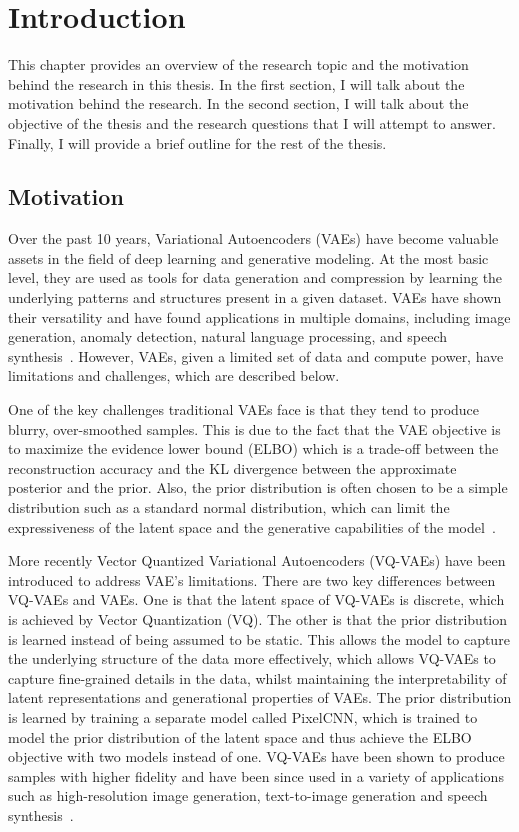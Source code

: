 \chapter{Introduction}

This chapter provides an overview of the research topic and the motivation behind the research in this thesis. In the first section, I will talk about the motivation behind the research. In the second section, I will talk about the objective of the thesis and the research questions that I will attempt to answer. Finally, I will provide a brief outline for the rest of the thesis.

\section{Motivation}

Over the past 10 years, Variational Autoencoders (VAEs) have become valuable assets in the field of deep learning and generative modeling. At the most basic level, they are used as tools for data generation and compression by learning the underlying patterns and structures present in a given dataset. VAEs have shown their versatility and have found applications in multiple domains, including image generation, anomaly detection, natural language processing, and speech synthesis~\cite{kingma2013autoencoding, Kingma_2019, vqvae, dalle}. However, VAEs, given a limited set of data and compute power, have limitations and challenges, which are described below.

One of the key challenges traditional VAEs face is that they tend to produce blurry, over-smoothed samples. This is due to the fact that the VAE objective is to maximize the evidence lower bound (ELBO) which is a trade-off between the reconstruction accuracy and the KL divergence between the approximate posterior and the prior. Also, the prior distribution is often chosen to be a simple distribution such as a standard normal distribution, which can limit the expressiveness of the latent space and the generative capabilities of the model~\cite{Kingma_2019}.

More recently Vector Quantized Variational Autoencoders (VQ-VAEs) have been introduced to address VAE's limitations. There are two key differences between VQ-VAEs and VAEs. One is that the latent space of VQ-VAEs is discrete, which is achieved by Vector Quantization (VQ). The other is that the prior distribution is learned instead of being assumed to be static. This allows the model to capture the underlying structure of the data more effectively, which allows VQ-VAEs to capture fine-grained details in the data, whilst maintaining the interpretability of latent representations and generational properties of VAEs. The prior distribution is learned by training a separate model called PixelCNN, which is trained to model the prior distribution of the latent space and thus achieve the ELBO objective with two models instead of one. VQ-VAEs have been shown to produce samples with higher fidelity and have been since used in a variety of applications such as high-resolution image generation, text-to-image generation and speech synthesis~\cite{vqvae,vqvae2, dalle}.

